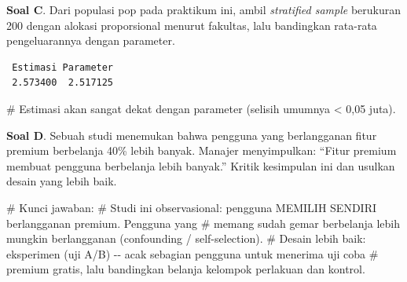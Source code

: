 \documentclass[
  indonesian,
  letterpaper,
]{book}
\newenvironment{Shaded}{\begin{snugshade}}{\end{snugshade}}
\newcommand{\AttributeTok}[1]{\textcolor[rgb]{0.40,0.45,0.13}{#1}}
\newcommand{\CommentTok}[1]{\textcolor[rgb]{0.37,0.37,0.37}{#1}}
\newcommand{\ControlFlowTok}[1]{\textcolor[rgb]{0.00,0.23,0.31}{\textbf{#1}}}
\newcommand{\DecValTok}[1]{\textcolor[rgb]{0.68,0.00,0.00}{#1}}
\newcommand{\FunctionTok}[1]{\textcolor[rgb]{0.28,0.35,0.67}{#1}}
\newcommand{\NormalTok}[1]{\textcolor[rgb]{0.00,0.23,0.31}{#1}}
\newcommand{\OtherTok}[1]{\textcolor[rgb]{0.00,0.23,0.31}{#1}}
\newcommand{\SpecialCharTok}[1]{\textcolor[rgb]{0.37,0.37,0.37}{#1}}
\begin{document}
\textbf{Soal C}. Dari populasi pop pada praktikum ini, ambil
\emph{stratified sample} berukuran 200 dengan alokasi proporsional
menurut fakultas, lalu bandingkan rata-rata pengeluarannya dengan
parameter.

\begin{Shaded}
\end{Shaded}

\begin{verbatim}
 Estimasi Parameter 
 2.573400  2.517125 
\end{verbatim}

\begin{Shaded}
\begin{Highlighting}[]
\CommentTok{\# Estimasi akan sangat dekat dengan parameter (selisih umumnya \textless{} 0,05 juta).}
\end{Highlighting}
\end{Shaded}

\textbf{Soal D}. Sebuah studi menemukan bahwa pengguna yang berlangganan
fitur premium berbelanja 40\% lebih banyak. Manajer menyimpulkan:
``Fitur premium membuat pengguna berbelanja lebih banyak.'' Kritik
kesimpulan ini dan usulkan desain yang lebih baik.

\begin{Shaded}
\begin{Highlighting}[]
\CommentTok{\# Kunci jawaban:}
\CommentTok{\# Studi ini observasional: pengguna MEMILIH SENDIRI berlangganan premium. Pengguna yang}
\CommentTok{\# memang sudah gemar berbelanja lebih mungkin berlangganan (confounding / self{-}selection).}
\CommentTok{\# Desain lebih baik: eksperimen (uji A/B) {-}{-} acak sebagian pengguna untuk menerima uji coba}
\CommentTok{\# premium gratis, lalu bandingkan belanja kelompok perlakuan dan kontrol.}
\end{Highlighting}
\end{Shaded}
\end{document}
